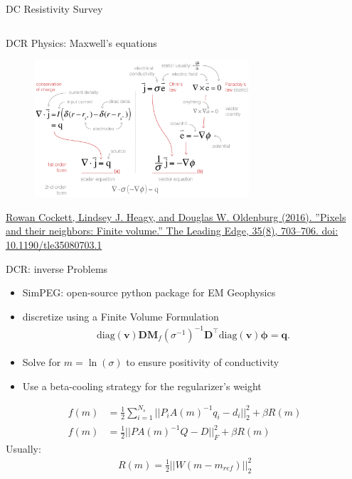 \documentclass[12pt]{beamer}
\begin{document}
\begin{frame}{DC Resistivity Survey}
\begin{columns}
\end{columns}

\end{frame}

\begin{frame}{DCR Physics: Maxwell's equations}

\begin{figure}[t!]
    \includegraphics[width=80mm]{figures/DCEquations.png}
\end{figure}

\href{http://tutorials.simpeg.xyz/content/pixelsandtheirneighbors.html}{\color{gray} Rowan Cockett, Lindsey J. Heagy, and Douglas W. Oldenburg (2016). ”Pixels and their neighbors: Finite volume.” The Leading Edge, 35(8), 703–706. doi: 10.1190/tle35080703.1}

\end{frame}

\begin{frame}{DCR: inverse Problems}

\begin{itemize}
  \item SimPEG: open-source python package for EM Geophysics
  \item discretize using a Finite Volume Formulation
  \begin{align}
  \text{diag}(\mathbf{v})
  \mathbf{D}
  \mathbf{M}_f(\sigma^{-1})^{-1}
  \mathbf{D}^\top
  \text{diag}(\mathbf{v})
  \boldsymbol{\phi} =
  \mathbf{q}.
  \end{align}
  \item Solve for $m = \ln(\sigma)$ to ensure positivity of conductivity
  \item Use a beta-cooling strategy for the regularizer's weight
\end{itemize}

\begin{align}
f(m) &= \frac{1}{2} \sum_{i=1}^{N_s} ||P_iA(m)^{-1}q_i-d_i||_2^2 + \beta R(m) \\
f(m) & = \frac{1}{2} ||PA(m)^{-1}Q-D||_F^2  +\beta R(m)
\end{align}
Usually:
\begin{align}
R(m) = \frac{1}{2} ||W(m-m_{ref})||_2^2
\end{align}

\end{frame}
\end{document}
